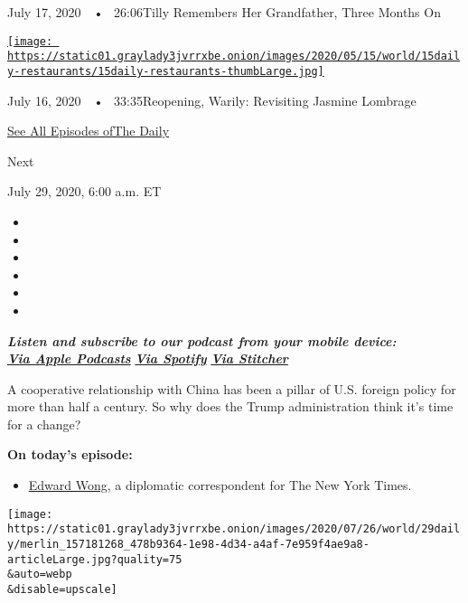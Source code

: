 July 17, 2020~~•~ 26:06Tilly Remembers Her Grandfather, Three Months On

\href{https://www.nytimes3xbfgragh.onion/2020/07/16/podcasts/the-daily/restaurant-reopening-louisiana.html?action=click\&module=audio-series-bar\&region=header\&pgtype=Article}{\texttt{[image: https://static01.graylady3jvrrxbe.onion/images/2020/05/15/world/15daily-restaurants/15daily-restaurants-thumbLarge.jpg]}}

July 16, 2020~~•~ 33:35Reopening, Warily: Revisiting Jasmine Lombrage

\href{https://www.nytimes3xbfgragh.onion/column/the-daily}{See All
Episodes ofThe Daily}

Next

July 29, 2020, 6:00 a.m. ET

\begin{itemize}
\item
\item
\item
\item
\item
\item
\end{itemize}

\emph{\textbf{Listen and subscribe to our podcast from your mobile
device:}}\\
\textbf{\href{https://itunes.apple.com/us/podcast/the-daily/id1200361736?mt=2}{\emph{Via
Apple Podcasts}}} \emph{\textbf{\textbar{}}}
\textbf{\href{https://open.spotify.com/show/3IM0lmZxpFAY7CwMuv9H4g?si=SfuMSC55R1qprFsRZU3_zw}{\emph{Via
Spotify}}} \emph{\textbf{\textbar{}}}
\textbf{\href{http://www.stitcher.com/podcast/the-new-york-times/the-daily-10}{\emph{Via
Stitcher}}}

A cooperative relationship with China has been a pillar of U.S. foreign
policy for more than half a century. So why does the Trump
administration think it's time for a change?

\textbf{On today's episode:}

\begin{itemize}
\tightlist
\item
  \href{https://www.nytimes3xbfgragh.onion/by/edward-wong}{Edward Wong},
  a diplomatic correspondent for The New York Times.
\end{itemize}

\texttt{[image: https://static01.graylady3jvrrxbe.onion/images/2020/07/26/world/29daily/merlin\_157181268\_478b9364-1e98-4d34-a4af-7e959f4ae9a8-articleLarge.jpg?quality=75\\\&auto=webp\\\&disable=upscale]}

